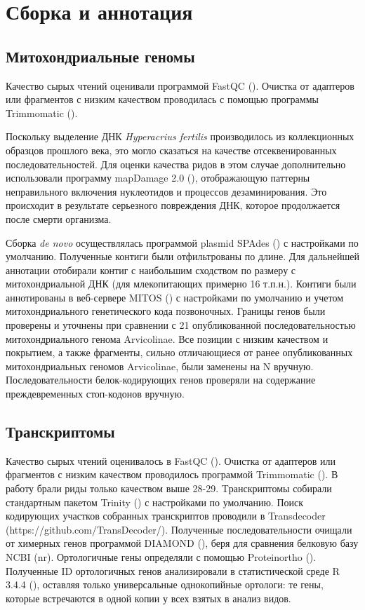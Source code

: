 \section{Сборка и аннотация}

\subsection{Митохондриальные геномы}

Качество сырых чтений оценивали программой FastQC (\cite{Andrews2010}). Очистка от адаптеров или фрагментов с низким качеством проводилась с помощью программы Trimmomatic (\cite{Bolger2014}). 

Поскольку выделение ДНК \textit{Hyperacrius fertilis} производилось из коллекционных образцов прошлого века, это могло сказаться на качестве отсеквенированных последовательностей. Для оценки качества ридов в этом случае дополнительно использовали программу mapDamage 2.0 (\cite{Jonsson2013}), отображающую паттерны неправильного включения нуклеотидов и процессов дезаминирования. Это происходит в результате серьезного повреждения ДНК, которое продолжается после смерти организма.

Сборка \textit{de novo} осуществлялась программой plasmid SPAdes (\cite{Bankevich2012}) с настройками по умолчанию. Полученные контиги были отфильтрованы по длине. Для дальнейшей аннотации отобирали контиг с наибольшим сходством по размеру с митохондриальной ДНК (для млекопитающих примерно 16 т.п.н.). Контиги были аннотированы в веб-сервере MITOS (\cite{Bernt2013}) с настройками по умолчанию и учетом митохондриального генетического кода позвоночных. Границы генов были проверены и уточнены при сравнении с 21 опубликованной последовательностью митохондриального генома Arvicolinae. Все позиции с низким качеством и покрытием, а также фрагменты, сильно отличающиеся от ранее опубликованных митохондриальных геномов Arvicolinae, были заменены на N вручную. Последовательности белок-кодирующих генов проверяли на содержание преждевременных стоп-кодонов вручную.


\subsection{Транскриптомы}

Качество сырых чтений оценивалось в FastQC (\cite{Andrews2010}). Очистка от адаптеров или фрагментов с низким качеством проводилось программой Trimmomatic (\cite{Bolger2014}). В работу брали риды только качеством выше 28-29. Tранскриптомы собирали стандартным пакетом Trinity (\cite{Grabherr2011}) с настройками по умолчанию. Поиск кодирующих участков собранных транскриптов проводили в Transdecoder (https://github.com/TransDecoder/). Полученные последовательности очищали от химерных генов программой DIAMOND (\cite{Buchfink2015}), беря для сравнения белковую базу NCBI (nr). Ортологичные гены определяли с помощью Proteinortho (\cite{Lechner2011}). Полученные ID ортологичных генов анализировали в статистической среде R 3.4.4 (\cite{RCoreTeam2017}), оставляя только универсальные однокопийные ортологи: те гены, которые встречаются в одной копии у всех взятых в анализ видов. 


